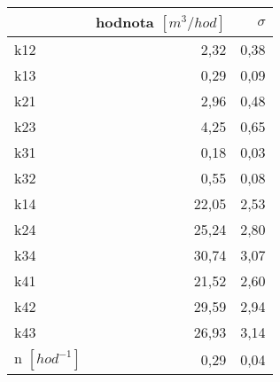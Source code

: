 \begin{tabular}{lrr}
\toprule
{} &  hodnota $\left[\si{m^3/hod}\right]$ &  $\sigma$ \\
\midrule
k12                 &                                 2,32 &      0,38 \\
k13                 &                                 0,29 &      0,09 \\
k21                 &                                 2,96 &      0,48 \\
k23                 &                                 4,25 &      0,65 \\
k31                 &                                 0,18 &      0,03 \\
k32                 &                                 0,55 &      0,08 \\
k14                 &                                22,05 &      2,53 \\
k24                 &                                25,24 &      2,80 \\
k34                 &                                30,74 &      3,07 \\
k41                 &                                21,52 &      2,60 \\
k42                 &                                29,59 &      2,94 \\
k43                 &                                26,93 &      3,14 \\
n $[\si{hod^{-1}}]$ &                                 0,29 &      0,04 \\
\bottomrule
\end{tabular}
